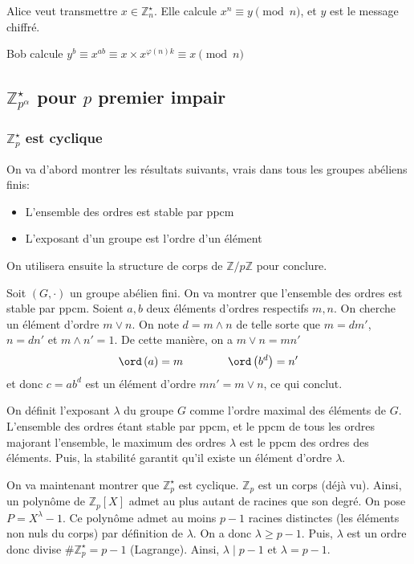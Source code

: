 Alice veut transmettre $x\in\mathbb Z_n^\star$. Elle calcule $x^n\equiv y\pmod n$, et $y$ est le message chiffré.

Bob calcule $y^b\equiv x^{ab}\equiv x\times x^{\varphi(n)k}\equiv x\pmod n$

\subsection{$\mathbb Z_{p^\alpha}^\star$ pour $p$ premier impair}

\subsubsection{$\mathbb Z_p^\star$ est cyclique}

On va d'abord montrer les résultats suivants, vrais dans tous les groupes abéliens finis: \begin{itemize}
    \item L'ensemble des ordres est stable par ppcm
    \item L'exposant d'un groupe est l'ordre d'un élément
\end{itemize}
On utilisera ensuite la structure de corps de $\mathbb Z/p\mathbb Z$ pour conclure.

Soit $(G, \cdot)$ un groupe abélien fini. On va montrer que l'ensemble des ordres est stable par ppcm. Soient $a, b$ deux éléments d'ordres respectifs $m, n$. On cherche un élément d'ordre $m\lor n$. On note $d=m\land n$ de telle sorte que $m=dm'$, $n=dn'$ et $m\land n'=1$. De cette manière, on a $m\lor n=mn'$
\[
    \ord \left(a\right)=m\qquad \qquad \ord\left(b^d\right)=n'
\]
et donc $c=ab^d$ est un élément d'ordre $mn'=m\lor n$, ce qui conclut.

On définit l'exposant $\lambda$ du groupe $G$ comme l'ordre maximal des éléments de $G$. L'ensemble des ordres étant stable par ppcm, et le ppcm de tous les ordres majorant l'ensemble, le maximum des ordres $\lambda$ est le ppcm des ordres des éléments. Puis, la stabilité garantit qu'il existe un élément d'ordre $\lambda$.

On va maintenant montrer que $\mathbb Z_p^\star$ est cyclique. $\mathbb Z_p$ est un corps (déjà vu). Ainsi, un polynôme de $\mathbb Z_p[X]$ admet au plus autant de racines que son degré. On pose $P=X^\lambda-1$. Ce polynôme admet au moins $p-1$ racines distinctes (les éléments non nuls du corps) par définition de $\lambda$. On a donc $\lambda\geq p-1$. Puis, $\lambda$ est un ordre donc divise $\#\mathbb Z_p^\star=p-1$ (Lagrange). Ainsi, $\lambda\mid p-1$ et $\lambda=p-1$.

